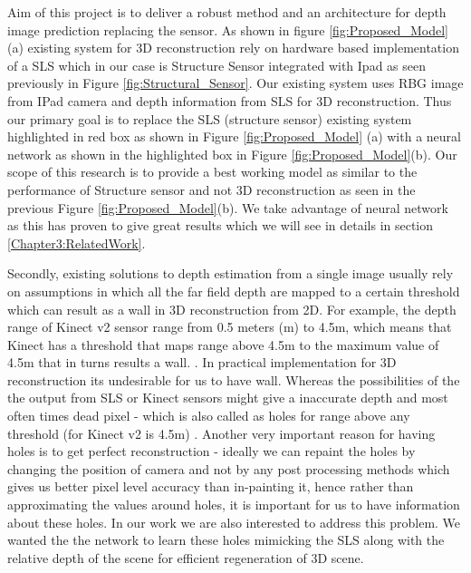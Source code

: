 Aim of this project is to deliver a robust method and an architecture for depth image prediction replacing the sensor. As shown in figure \ref{fig:Proposed_Model} (a) existing system for 3D reconstruction rely on hardware based implementation of a SLS which in our case is Structure Sensor integrated with Ipad as seen previously in Figure \ref{fig:Structural_Sensor}. Our existing system uses RBG image from IPad camera and depth information from SLS for 3D reconstruction. Thus our primary goal is to replace the SLS (structure sensor) existing system highlighted in red box as shown in Figure \ref{fig:Proposed_Model} (a) with a neural network as shown in the highlighted box in Figure \ref{fig:Proposed_Model}(b). Our scope of this research is to provide a best working model as similar to the performance of Structure sensor and not 3D reconstruction as seen in the previous Figure \ref{fig:Proposed_Model}(b).  We take advantage of neural network as this has proven to give great results which we will see in details in section \ref{Chapter3:RelatedWork}.


Secondly, existing solutions to depth estimation from a single image usually rely on assumptions in which all the far field depth are mapped to a certain threshold which can result as a wall in 3D reconstruction from 2D. For example, the depth range of Kinect v2 sensor range from 0.5 meters (m) to 4.5m, which means that Kinect has a threshold that maps range above 4.5m to the maximum value of 4.5m that in turns results a wall. \cite{Silberman:ECCV12}. In practical implementation for 3D reconstruction its undesirable for us to have wall. Whereas the possibilities of the the output from SLS or Kinect sensors might give a inaccurate depth and most often times dead pixel - which is also called as holes for range above any threshold (for Kinect v2 is 4.5m) \cite{kinecttof}. Another very important reason for having holes is to get perfect reconstruction - ideally we can repaint the holes by changing the position of camera and not by any post processing methods which gives us better pixel level accuracy than in-painting it, hence rather than approximating the values around holes, it is important for us to have information about these holes. In our work we are also interested to address this problem. We wanted the the network to learn these holes mimicking the SLS along with the relative depth of the scene for efficient regeneration of 3D scene. 

